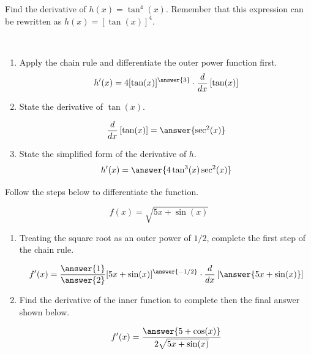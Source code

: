 \documentclass{ximera}
\begin{document}
\begin{problem}
Find the derivative of $h(x) = \tan^4(x)$.  Remember that this expression can be rewritten as $h(x) = [\tan(x)]^4$.

~ \\[1em]
\begin{enumerate}
\item Apply the chain rule and differentiate the outer power function first.
\[
h'(x) = 4[\tan(x)]^{\answer{3}} \cdot \frac{d}{dx}\left[\tan(x)\right]
\]

\item State the derivative of $\tan(x).$ 

\[ \frac{d}{dx}\left[\tan(x)\right] =  \answer{\sec^2(x)} \]

\item State the simplified form of the derivative of $h.$
\[
h'(x) = \answer{4\tan^3(x)\sec^2(x)}
\]

\end{enumerate}
\end{problem}


\begin{problem}
Follow the steps below to differentiate the function.


\[ f(x) = \sqrt{5x + \sin(x)} \]

\begin{enumerate}
\item Treating the square root as an outer power of $1/2$, complete the first step of the chain rule.

\[
f'(x) = \frac{ \answer{1} }{ \answer{2} }[5x + \sin(x)]^{ \answer{-1/2} } \cdot \frac{d}{dx} \left[ \answer{5x + \sin(x)} \right]
\]

\item Find the derivative of the inner function to complete then the final answer shown below. 

\[
f'(x) = \frac{ \answer{5 + \cos(x)} }{ 2\sqrt{5x + \sin(x)} }
\]

\end{enumerate}
\end{problem}
\end{document}
